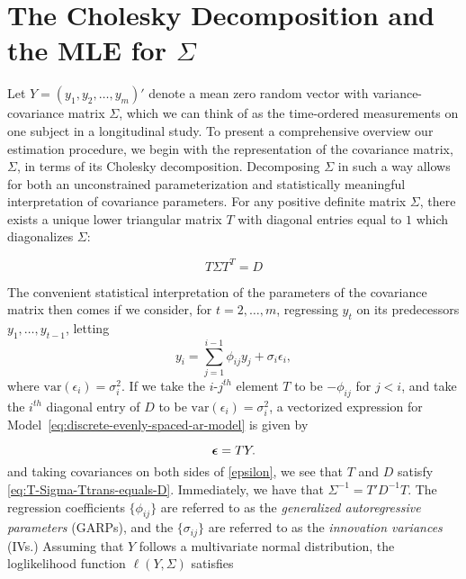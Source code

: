 \documentclass[12pt]{article}
\newcommand{\bfeps}{\mbox{\boldmath $\epsilon$}}
\theoremstyle{definition}
\begin{document}
{{{{\section{The Cholesky Decomposition and the MLE for $\Sigma$}

Let $Y = \left( y_{1}, y_{2}, \dots, y_{m} \right)'$ denote a mean zero random vector with variance-covariance matrix $\Sigma$, which we can think of as the time-ordered measurements on one subject in a longitudinal study. To present a comprehensive overview our estimation procedure, we begin with the representation of the covariance matrix, $\Sigma$, in terms of its Cholesky decomposition. Decomposing $\Sigma$ in such a way allows for both an unconstrained parameterization and statistically meaningful interpretation of covariance parameters. For any positive definite matrix $\Sigma$, there exists a unique lower triangular matrix $T$ with diagonal entries equal to $1$ which diagonalizes $\Sigma$:

\begin{equation} \label{eq:T-Sigma-Ttrans-equals-D}
 T \Sigma T^T = D
\end{equation}
\noindent

The convenient statistical interpretation of the parameters of the covariance matrix then comes if we consider, for $t = 2, \dots, m$, regressing $y_t$ on its predecessors $y_1,\dots, y_{t-1}$, letting
\begin{equation} 
{y}_{i}  = \sum_{j=1}^{i-1} \phi_{ij} y_{j} + \sigma_{i}\epsilon_{i} \label{eq:discrete-evenly-spaced-ar-model},
\end{equation}
\noindent
where $\mbox{var}\left( \epsilon_i \right) = \sigma_i^2$. If we take the $i$-$j^{th}$ element $T$ to be $-\phi_{ij}$ for $j < i$, and take the $i^{th}$ diagonal entry of $D$ to be $\mbox{var}\left( \epsilon_i \right) = \sigma_i^2$, a vectorized expression for Model~\ref{eq:discrete-evenly-spaced-ar-model} is given by

\begin{equation}
\bfeps = T Y \label{eq:vectorized-ar-model}.
\end{equation}
\noindent
and taking covariances on both sides of \eqref{epsilon}, we see that $T$ and $D$ satisfy \ref{eq:T-Sigma-Ttrans-equals-D}. Immediately, we have that $\Sigma^{-1} = T' D^{-1} T$. The regression coefficients $\lbrace \phi_{ij} \rbrace$ are referred to as the \emph{generalized autoregressive parameters} (GARPs), and the $\lbrace \sigma_{ij} \rbrace$ are referred to as the \emph{innovation variances} (IVs.) 
\bigskip
Assuming that $Y$ follows a multivariate normal distribution, the loglikelihood function $\ell \left( Y, \Sigma \right)$ satisfies

}}}}
\end{document}
